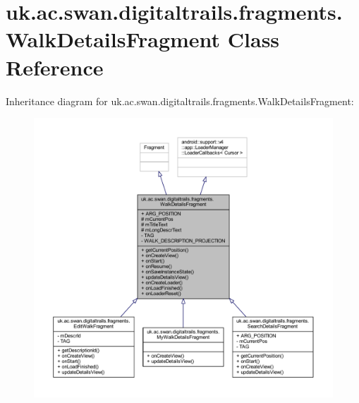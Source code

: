 \hypertarget{classuk_1_1ac_1_1swan_1_1digitaltrails_1_1fragments_1_1_walk_details_fragment}{\section{uk.\+ac.\+swan.\+digitaltrails.\+fragments.\+Walk\+Details\+Fragment Class Reference}
\label{classuk_1_1ac_1_1swan_1_1digitaltrails_1_1fragments_1_1_walk_details_fragment}
}


Inheritance diagram for uk.\+ac.\+swan.\+digitaltrails.\+fragments.\+Walk\+Details\+Fragment\+:
\nopagebreak
\begin{figure}[H]
\begin{center}
\leavevmode
\includegraphics[width=350pt]{classuk_1_1ac_1_1swan_1_1digitaltrails_1_1fragments_1_1_walk_details_fragment__inherit__graph}
\end{center}
\end{figure}


